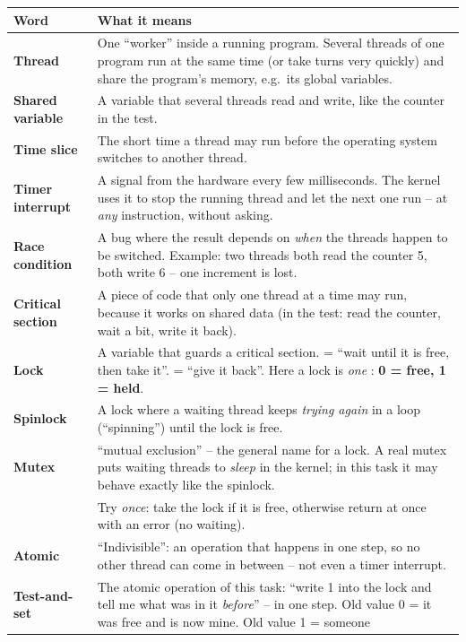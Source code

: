 \documentclass[11pt]{report}
\begin{document}
{\small
\begin{longtable}{@{}L{3.3cm} L{12.1cm}@{}}
\toprule
\textbf{Word} & \textbf{What it means}\\\midrule
\endhead
\textbf{Thread} & One ``worker'' inside a running program. Several threads of one program run at the
  same time (or take turns very quickly) and share the program's memory, e.g.\ its global variables.\\
\textbf{Shared variable} & A variable that several threads read and write, like the counter in the
  test.\\
\textbf{Time slice} & The short time a thread may run before the operating system switches to
  another thread.\\
\textbf{Timer interrupt} & A signal from the hardware every few milliseconds. The kernel uses it to
  stop the running thread and let the next one run -- at \emph{any} instruction, without asking.\\
\textbf{Race condition} & A bug where the result depends on \emph{when} the threads happen to be
  switched. Example: two threads both read the counter 5, both write 6 -- one increment is lost.\\
\textbf{Critical section} & A piece of code that only one thread at a time may run, because it works
  on shared data (in the test: read the counter, wait a bit, write it back).\\
\textbf{Lock} & A variable that guards a critical section.  = ``wait until it is free, then
  take it''.  = ``give it back''. Here a lock is \emph{one} :
  \textbf{0 = free, 1 = held}.\\
\textbf{Spinlock} & A lock where a waiting thread keeps \emph{trying again} in a loop (``spinning'')
  until the lock is free.\\
\textbf{Mutex} & ``mutual exclusion'' -- the general name for a lock. A real mutex puts waiting threads
  to \emph{sleep} in the kernel; in this task it may behave exactly like the spinlock.\\
\textbf{} & Try \emph{once}: take the lock if it is free, otherwise return at once with
  an error (no waiting).\\
\textbf{Atomic} & ``Indivisible'': an operation that happens in one step, so no other thread can come
  in between -- not even a timer interrupt.\\
\textbf{Test-and-set} & The atomic operation of this task: ``write 1 into the lock and tell me what was
  in it \emph{before}'' -- in one step. Old value 0 = it was free and is now mine. Old value 1 = someone

\end{longtable}}
\end{document}
